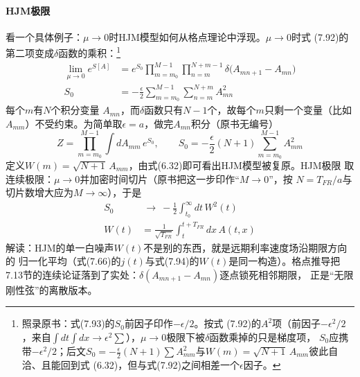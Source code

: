 \paragraph{HJM极限}
看一个具体例子：$\mu\to0$时HJM模型如何从格点理论中浮现。$\mu\to0$时式
(7.92)的第二项变成$\delta$函数的乘积：\footnote{照录原书：式(7.93)的$S_{0}$前因子印作$-\epsilon/2$。按式
(7.92)的$A^{2}$项（前因子$-\epsilon^{2}/2$，来自$\int dt\int dx\to
\epsilon^{2}\sum$），$\mu\to0$极限下被$\delta$函数乘掉的只是梯度项，
$S_{0}$应携带$-\epsilon^{2}/2$；后文$S_{0}=-\frac{\epsilon}{2}
(N+1)\sum A_{mm}^{2}$与$W(m)=\sqrt{N+1}\,A_{mm}$彼此自洽、且能回到式
(6.32)，但与式(7.92)之间相差一个$\epsilon$因子。}
\begin{align*}
\lim_{\mu\to0}e^{S[A]}&=e^{S_{0}}\prod_{m=m_{0}}^{M-1}\prod_{n=m}^{N+m-1}
\delta\bigl(A_{mn+1}-A_{mn}\bigr)\\
S_{0}&=-\frac{\epsilon}{2}\sum_{m=m_{0}}^{M-1}\sum_{n=m}^{N+m}A_{mn}^{2}
\tag{7.93}
\end{align*}每个$m$有$N$个积分变量
$A_{mn}$，而$\delta$函数只有$N-1$个，故每个$m$只剩一个变量（比如
$A_{mm}$）不受约束。为简单取$\epsilon=a$，做完$A_{mn}$积分（原书无编号）
\begin{equation*}
Z=\prod_{m=m_{0}}^{M-1}\int dA_{mm}\,e^{S_{0}},
\qquad
S_{0}=-\frac{\epsilon}{2}(N+1)\sum_{m=m_{0}}^{M-1}A_{mm}^{2}
\end{equation*}
定义$W(m)=\sqrt{N+1}\,A_{mm}$，由式(6.32)即可看出HJM模型被复原。HJM极限
取连续极限：$\mu\to0$并加密时间切片（原书把这一步印作“$M\to0$”，按
$N=T_{FR}/a$与切片数增大应为$M\to\infty$），于是
\begin{align*}
S_{0}&\ \longrightarrow\ -\frac{1}{2}\int_{t_{0}}^{\infty}dt\,W^{2}(t)\\
W(t)&=\frac{1}{\sqrt{T_{FR}}}\int_{t}^{t+T_{FR}}dx\,A(t,x)
\tag{7.94}
\end{align*}
解读：HJM的单一白噪声$W(t)$不是别的东西，就是远期利率速度场沿期限方向的
归一化平均（式(7.66)的$j(t)$与式(7.94)的$W(t)$是同一构造）。格点推导把
7.13节的连续论证落到了实处：$\delta(A_{mn+1}-A_{mn})$逐点锁死相邻期限，
正是“无限刚性弦”的离散版本。

